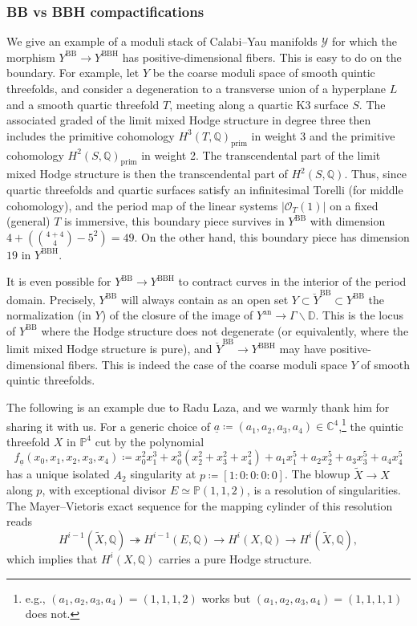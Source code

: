 \documentclass{amsart}
\newcommand{\bs}{\backslash}
\newcommand{\an}{\operatorname{an}}
\theoremstyle{definition}
\theoremstyle{remark}
\def\bD{\mathbb{D}}
\def\bQ{\mathbb{Q}}
\def\bC{\mathbb{C}}
\def\bP{\mathbb{P}}
\def\cO{\mathcal{O}}
\def\cY{\mathcal{Y}}
\def\an{\mathrm{an}}
\def\BB{\mathrm{BB}}
\def\BBH{\mathrm{BBH}}
\numberwithin{equation}{section}
\begin{document}
\subsubsection{
BB vs BBH compactifications}\label{eg:BBvsBBH}  We give an example of a moduli stack of Calabi--Yau manifolds $\cY$ for which the morphism $Y^\BB\to Y^\BBH$ has positive-dimensional fibers.  This is easy to do on the boundary.  For example, let $Y$ be the coarse moduli space of smooth quintic threefolds, and consider a degeneration to a transverse union of a hyperplane $L$ and a smooth quartic threefold $T$, meeting along a quartic K3 surface $S$.  The associated graded of the limit mixed Hodge structure in degree three then includes the primitive cohomology $H^3(T,\bQ)_{\mathrm{prim}}$ in weight 3 and the primitive cohomology $H^2(S,\bQ)_{\mathrm{prim}}$ in weight 2.  The transcendental part of the limit mixed Hodge structure is then the transcendental part of $H^2(S,\bQ)$.  Thus, since quartic threefolds and quartic surfaces satisfy an infinitesimal Torelli (for middle cohomology), and the period map of the linear systems $|\cO_T(1)|$ on a fixed (general) $T$ is immersive, this boundary piece survives in $Y^\BB$ with dimension 
$4+(\binom{4+4}{4}-5^2)=49$.  On the other hand, this boundary piece has dimension $19$ in $Y^\BBH$.


It is even possible for $Y^\BB\to Y^\BBH$ to contract curves in the interior of the period domain.  Precisely, $Y^\BB$ will always contain as an open set $Y\subset \breve{Y}^\BB\subset Y^\BB$ the normalization (in $Y$) of the closure of the image of $Y^\an\to \Gamma\bs \bD$.  This is the locus of $Y^\BB$ where the Hodge structure does not degenerate (or equivalently, where the limit mixed Hodge structure is pure), and $\breve {Y}^\BB\to Y^\BBH$ may have positive-dimensional fibers. This is indeed the case of the coarse moduli space $Y$ of smooth quintic threefolds. 

The following is an example due to Radu Laza, and we warmly thank him for sharing it with us. For a generic choice of $\underline{a} \coloneqq (a_1, a_2, a_3, a_4) \in \bC^4$,\footnote{e.g., $(a_1, a_2, a_3, a_4)=(1,1,1,2)$ works but $(a_1, a_2, a_3, a_4)=(1,1,1,1)$ does not.} the quintic threefold $X$ in $\bP^4$
cut by the polynomial
\[
f_{\underline{a}}(x_0, x_1, x_2, x_3, x_4) \coloneqq x_0^2 x^3_1 + x_0^3(x_2^2+ x_3^2+x_4^2) + a_1 x_1^5+a_2 x_2^5+a_3 x_3^5+ a_4 x_4^5
\]
has a unique isolated $A_2$ singularity at $p \coloneqq [1:0:0:0:0]$. The blowup $\widetilde{X} \to X$ along $p$, with exceptional divisor $E \simeq \bP(1,1,2)$, is a resolution of singularities. The Mayer--Vietoris exact sequence for the mapping cylinder of this resolution reads \[H^{i-1}(\widetilde{X}, \bQ) \twoheadrightarrow H^{i-1}(E, \bQ) \to H^{i}(X, \bQ) \to H^{i}(\widetilde{X}, \bQ),\]
which implies that $H^i(X, \bQ)$ carries a pure Hodge structure. 
\end{document}
